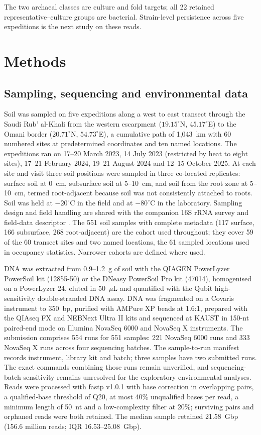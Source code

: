 \documentclass[11pt]{article}
\begin{document}
The two archaeal classes are culture and fold targets; all 22 retained representative--culture groups are bacterial. Strain-level persistence across five expeditions is the next study on
these reads.

\section*{Methods}

\subsection*{Sampling, sequencing and environmental data}
Soil was sampled on five expeditions along a west to east transect through the Saudi Rub' al-Khali
from the western escarpment ($19.15^\circ$N, $45.17^\circ$E) to the Omani border ($20.71^\circ$N,
$54.73^\circ$E), a cumulative path of 1{,}043~km with 60 numbered sites at predetermined coordinates
and ten named locations. The expeditions ran on 17--20 March 2023, 14 July 2023 (restricted by heat
to eight sites), 17--21 February 2024, 19--21 August 2024 and 12--15 October 2025. At each site and
visit three soil positions were sampled in three co-located replicates: surface soil at 0~cm,
subsurface soil at 5--10~cm, and soil from the root zone at 5--10~cm, termed root-adjacent because
soil was not consistently attached to roots. Soil was held at $-20^\circ$C in the field and at
$-80^\circ$C in the laboratory. Sampling design and field handling are shared with the companion
16S rRNA survey and field-data descriptor \citep{tawfiq2026companion,rubalkhali_datapaper}. The 551 soil samples with complete metadata (117 surface, 166 subsurface, 268 root-adjacent)
are the cohort used throughout; they cover 59 of the 60 transect sites and two named locations, the
61 sampled locations used in occupancy statistics. Narrower cohorts are defined where used.

DNA was extracted from 0.9--1.2~g of soil with the QIAGEN PowerLyzer PowerSoil kit (12855-50) or the
DNeasy PowerSoil Pro kit (47014), homogenised on a PowerLyzer 24, eluted in 50~$\mu$L and quantified
with the Qubit high-sensitivity double-stranded DNA assay. DNA was fragmented on a Covaris instrument
to 350~bp, purified with AMPure XP beads at 1.6:1, prepared with the QIAseq FX and NEBNext Ultra II
kits and sequenced at KAUST in 150-nt paired-end mode on Illumina NovaSeq 6000 and NovaSeq X instruments.
The submission comprises 554 runs for 551 samples: 221 NovaSeq 6000 runs and 333 NovaSeq X runs
across four sequencing batches. The sample-to-run manifest records instrument, library kit and
batch; three samples have two submitted runs. The exact commands combining those runs remain unverified, and sequencing-batch sensitivity remains unresolved for the exploratory environmental analyses. Reads were
processed with fastp v1.0.1 \citep{chen2018fastp} with base correction in overlapping pairs, a
qualified-base threshold of Q20, at most 40\% unqualified bases per read, a minimum length of 50~nt
and a low-complexity filter at 20\%; surviving pairs and orphaned reads were both retained. The
median sample retained 21.58~Gbp (156.6 million reads; IQR 16.53--25.08~Gbp).
\end{document}

